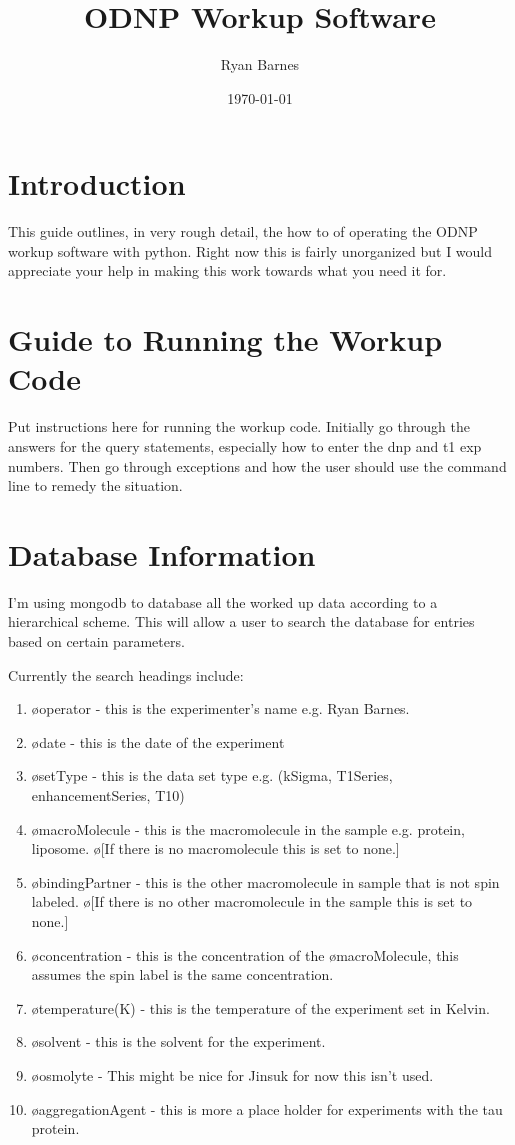 \documentclass[10pt]{book}
\author{Ryan Barnes}
\title{ODNP Workup Software}
\date{\today}
\begin{document}
\maketitle
\section{Introduction}
This guide outlines, in very rough detail, the how to of operating the ODNP workup software with python. Right now this is fairly unorganized but I would appreciate your help in making this work towards what you need it for. 

\section{Guide to Running the Workup Code}
Put instructions here for running the workup code. Initially go through the answers for the query statements, especially how to enter the dnp and t1 exp numbers. Then go through exceptions and how the user should use the command line to remedy the situation.

\section{Database Information}
I'm using mongodb to database all the worked up data according to a hierarchical scheme. This will allow a user to search the database for entries based on certain parameters. 

Currently the search headings include:
\begin{enumerate}
    \item \o{operator} - this is the experimenter's name e.g. Ryan Barnes.
    \item \o{date} - this is the date of the experiment
    \item \o{setType} - this is the data set type e.g. (kSigma, T1Series, enhancementSeries, T10)
    \item \o{macroMolecule} - this is the macromolecule in the sample e.g. protein, liposome. \o[If there is no macromolecule this is set to none.]{} 
    \item \o{bindingPartner} - this is the other macromolecule in sample that is not spin labeled. \o[If there is no other macromolecule in the sample this is set to none.]{} 
    \item \o{concentration} - this is the concentration of the \o{macroMolecule}, this assumes the spin label is the same concentration.
    \item \o{temperature(K)} - this is the temperature of the experiment set in Kelvin.
    \item \o{solvent} - this is the solvent for the experiment.
    \item \o{osmolyte} - This might be nice for Jinsuk for now this isn't used.
    \item \o{aggregationAgent} - this is more a place holder for experiments with the tau protein.
\end{enumerate}
\end{document}
